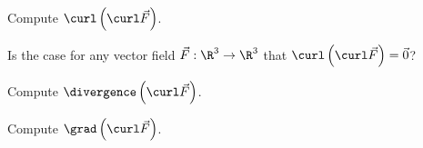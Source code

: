 \documentclass{ximera}
\begin{document}
\begin{exercise}
  Compute \(\curl \left( \curl \vec{F}\right)\).
  \begin{multipleChoice}
  \end{multipleChoice}

  \begin{exercise}
    Is the case for any vector field $\vec{F} : \R^3 \to \R^3$ that  \(\curl \left( \curl \vec{F}\right) = \vec{0}\)?

    \begin{multipleChoice}
    \end{multipleChoice}    
  \end{exercise}
\end{exercise}

\begin{exercise}
  Compute \(\divergence \left( \curl \vec{F}\right)\).
  \begin{multipleChoice}
  \end{multipleChoice}
\end{exercise}

\begin{exercise}
  Compute \(\grad \left( \curl \vec{F}\right)\).
  \begin{multipleChoice}
  \end{multipleChoice}
\end{exercise}
\end{document}
